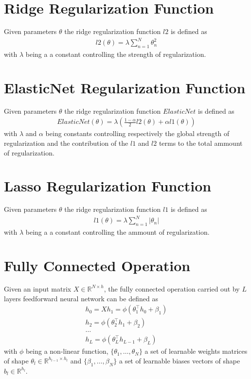 \section{Ridge Regularization Function}
Given parameters $\theta$ the ridge regularization function $l2$ is defined as 
\begin{gather}
    \label{ridge}
    l2(\theta) = \lambda \sum_{n=1}^{N}\theta_n^2
\end{gather}
with $\lambda$ being a a constant controlling the strength of regularization.

\section{ElasticNet Regularization Function}
Given parameters $\theta$ the ridge regularization function $ElasticNet$ is defined as 
\begin{gather}
    \label{enet_reg}
    ElasticNet(\theta) = \lambda (\frac{1 - \alpha}{2}l2(\theta) + \alpha l1(\theta))
\end{gather}
with $\lambda$ and $\alpha$ being constants controlling respectively the global strength of regularization and the contribution of the $l1$ and $l2$ terms to the total ammount of regularization.

\section{Lasso Regularization Function}
Given parameters $\theta$ the ridge regularization function $l1$ is defined as 
\begin{gather}
    \label{lasso}
    l1(\theta) = \lambda \sum_{n=1}^{N}|\theta_n|
\end{gather}
with $\lambda$ being a a constant controlling the ammount of regularization.

\section{Fully Connected Operation}
Given an input matrix $X \in \mathbb{R}^{N \times h}$, the fully connected operation carried out by $L$ layers feedforward neural network can be defined as
\begin{gather}
    \label{fnn_operation}
    h_0 = X
    h_1 = \phi(\theta_1^\top h_0 + \beta_1)\\ \nonumber
    h_2 = \phi(\theta_2^\top h_1  + \beta_2)\\ \nonumber
    \dots\\ \nonumber
    h_L = \phi(\theta_L^\top h_{L-1}  + \beta_L) \nonumber
\end{gather}
with $\phi$ being a non-linear function, $\{\theta_1, \dots, \theta_N\}$ a set of learnable weights matrices of shape $\theta_l \in \mathbb{R}^{h_{l-1} \times h_{l}}$ and $\{\beta_1, \dots, \beta_N\}$ a set of learnable biases vectors of shape $b_l \in \mathbb{R}^{h_l}$.

